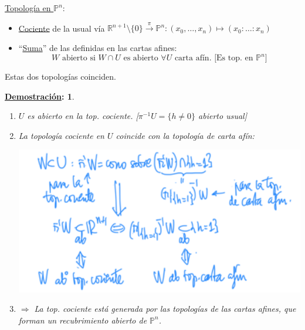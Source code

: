 \documentclass[10pt,a4paper,openright]{book}
\theoremstyle{break}
\newtheorem*{demo}{\underline{Demostración}:}
\begin{document}
\underline{Topología en }$\mathbb{P}^{n}$: 
\begin{itemize}
    \item \underline{Cociente} de la usual vía $\mathbb{R}^{n+1}\setminus \{0\} \xrightarrow{\pi} \mathbb{P}^{n}: \left( x_0, \ldots, x_n \right) \mapsto \left( x_0 : \ldots : x_n \right)$
    \item ``\underline{Suma}'' de las definidas en las cartas afines:
    \[
        W \text{ abierto si } W \cap U \text{ es abierto } \forall U \text{ carta afín. [Es top. en } \mathbb{P}^{n}] 
    \]
\end{itemize}
Estas dos topologías coinciden.
\begin{demo}
\begin{enumerate}
    \item $U$ es abierto en la top. cociente. [$\pi^{-1} U = \{h \neq 0\}$ abierto usual]
    \item La topología cociente en $U$ coincide con la topología de carta afín:
    \begin{center}
        \includegraphics[scale=0.3]{images/eq_top_proyectivo} 
    \end{center}
    \item[1. + 2.] $\Rightarrow $ La top. cociente está generada por las topologías de las cartas afines, que forman un recubrimiento abierto de $\mathbb{P}^{n}$.
\end{enumerate}
\end{demo}
\end{document}
